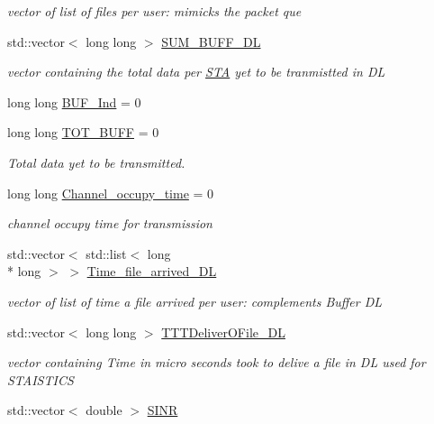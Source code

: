 \begin{DoxyCompactItemize}
\begin{DoxyCompactList}\small\item\em vector of list of files per user\-: mimicks the packet que \end{DoxyCompactList}\item 
std\-::vector$<$ long long $>$ \hyperlink{classAP_aaff6ce72b09dc955c0aaff3dc9fa0f04}{S\-U\-M\-\_\-\-B\-U\-F\-F\-\_\-\-D\-L}
\begin{DoxyCompactList}\small\item\em vector containing the total data per \hyperlink{classSTA}{S\-T\-A} yet to be tranmistted in D\-L \end{DoxyCompactList}\item 
long long \hyperlink{classAP_a6a9694207e9646b4a1c95b54725fcd3b}{B\-U\-F\-\_\-\-Ind} = 0
\item 
long long \hyperlink{classAP_a03aea575eb6665fe9498fd30352e1d35}{T\-O\-T\-\_\-\-B\-U\-F\-F} = 0
\begin{DoxyCompactList}\small\item\em Total data yet to be transmitted. \end{DoxyCompactList}\item 
long long \hyperlink{classAP_a2c168786c0400fa590bed7fabbca741e}{Channel\-\_\-occupy\-\_\-time} = 0
\begin{DoxyCompactList}\small\item\em channel occupy time for transmission \end{DoxyCompactList}\item 
std\-::vector$<$ std\-::list$<$ long \\*
long $>$ $>$ \hyperlink{classAP_a9d46a009bcda14f024fb046cd7d1e816}{Time\-\_\-file\-\_\-arrived\-\_\-\-D\-L}
\begin{DoxyCompactList}\small\item\em vector of list of time a file arrived per user\-: complements Buffer D\-L \end{DoxyCompactList}\item 
std\-::vector$<$ long long $>$ \hyperlink{classAP_a09493a33ac1503886caf3628aaf10dc7}{T\-T\-T\-Deliver\-O\-File\-\_\-\-D\-L}
\begin{DoxyCompactList}\small\item\em vector containing Time in micro seconds took to delive a file in D\-L used for S\-T\-A\-I\-S\-T\-I\-C\-S \end{DoxyCompactList}\item 
std\-::vector$<$ double $>$ \hyperlink{classAP_a462a6a6a0887dae6d6a045015a05c13a}{S\-I\-N\-R}

\end{DoxyCompactItemize}
